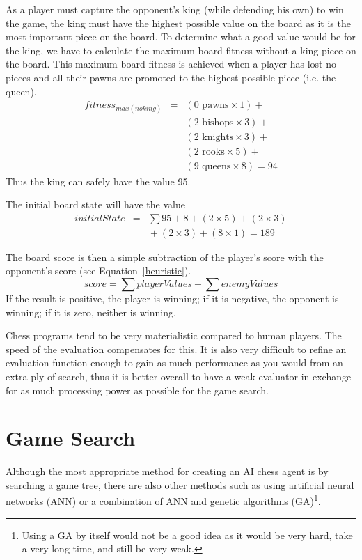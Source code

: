 \documentclass[11pt,letterpaper,twocolumn]{article}
\begin{document}
As a player must capture the opponent's king (while defending his own) to win the game, the king must have the highest possible value on the board as it is the most 
important piece on the board. To determine what a good value would be for the king, we have to calculate the maximum board fitness without a king piece on the board.
This maximum board fitness is achieved when a player has lost no pieces and all their pawns are promoted to the highest possible piece (i.e. the queen).
\begin{eqnarray*}
fitness_{max (no king)} & = & (0 \mbox{ pawns} \times 1) {}+\\
&& (2 \mbox{ bishops} \times 3) {}+\\
&& (2 \mbox{ knights} \times 3) {}+\\
&& (2 \mbox{ rooks} \times 5) {}+\\
&& (9 \mbox{ queens} \times 8) = 94
\label{max-fitness}
\end{eqnarray*}
Thus the king can safely have the value 95.

The initial board state will have the value
\begin{eqnarray*}
initialState & = & \sum{} 95 {}+ 8 {}+ (2 \times 5) {}+ (2 \times 3)\\
&& {}+ (2 \times 3) {}+ (8 \times 1) = 189
\label{initial-fitness}
\end{eqnarray*}

The board score is then a simple subtraction of the player's score with the opponent's score (see Equation~\ref{heuristic}).
\begin{equation}
score = \sum{playerValues} - \sum{enemyValues}
\label{heuristic}
\end{equation}
If the result is positive, the player is winning; if it is negative, the opponent is winning; if it is zero, neither is winning.

Chess programs tend to be very materialistic compared to human players. The speed of the evaluation compensates for this. 
It is also very difficult to refine an evaluation function enough to gain as much performance as you would from an extra ply of search, thus it is better overall
to have a weak evaluator in exchange for as much processing power as possible for the game search.

\section{Game Search}
Although the most appropriate method for creating an AI chess agent is by searching a game tree, there are also other methods such as using artificial neural networks (ANN)
or a combination of ANN and genetic algorithms (GA)\footnote{Using a GA by itself would not be a good idea as it would be very hard, take a very long time, and still be
very weak.}.
\end{document}
